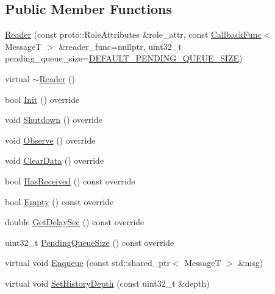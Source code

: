 \subsection*{Public Member Functions}
\begin{DoxyCompactItemize}
\item 
\hyperlink{classapollo_1_1cyber_1_1Reader_a69f4d76924d5313aa62254b479f74741}{Reader} (const proto\-::\-Role\-Attributes \&role\-\_\-attr, const \hyperlink{namespaceapollo_1_1cyber_ac2b119de9ef52dbfcee3b6e8d497adc4}{Callback\-Func}$<$ Message\-T $>$ \&reader\-\_\-func=nullptr, uint32\-\_\-t pending\-\_\-queue\-\_\-size=\hyperlink{namespaceapollo_1_1cyber_a2f6db02a0b926d2d76f73ce52c149047}{D\-E\-F\-A\-U\-L\-T\-\_\-\-P\-E\-N\-D\-I\-N\-G\-\_\-\-Q\-U\-E\-U\-E\-\_\-\-S\-I\-Z\-E})
\item 
virtual \hyperlink{classapollo_1_1cyber_1_1Reader_a23bf2eaed41aa7764fdc5f3d0f6dc3f4}{$\sim$\-Reader} ()
\item 
bool \hyperlink{classapollo_1_1cyber_1_1Reader_a249fd8fc318b8f86d018d2016b926ca4}{Init} () override
\item 
void \hyperlink{classapollo_1_1cyber_1_1Reader_accc21ea8144e9c577be55ca03e152769}{Shutdown} () override
\item 
void \hyperlink{classapollo_1_1cyber_1_1Reader_a00b3cdc0a487ed6fe0f68e703166d391}{Observe} () override
\item 
void \hyperlink{classapollo_1_1cyber_1_1Reader_ab286c2d587e10eadb339bcf55f4a9567}{Clear\-Data} () override
\item 
bool \hyperlink{classapollo_1_1cyber_1_1Reader_aca67f3936aa209c1a73f1ca984062f3a}{Has\-Received} () const override
\item 
bool \hyperlink{classapollo_1_1cyber_1_1Reader_ab3e96bf171f2d1fbbafa40da14590548}{Empty} () const override
\item 
double \hyperlink{classapollo_1_1cyber_1_1Reader_a51cdaa33430e6c1b2905336066a4b6f2}{Get\-Delay\-Sec} () const override
\item 
uint32\-\_\-t \hyperlink{classapollo_1_1cyber_1_1Reader_a9f787ae54e884141d13396345b56c9e2}{Pending\-Queue\-Size} () const override
\item 
virtual void \hyperlink{classapollo_1_1cyber_1_1Reader_a9acce2d137849540e434596de51b10bf}{Enqueue} (const std\-::shared\-\_\-ptr$<$ Message\-T $>$ \&msg)
\item 
virtual void \hyperlink{classapollo_1_1cyber_1_1Reader_a20a9b73c463c8f65b9592bb295745fa6}{Set\-History\-Depth} (const uint32\-\_\-t \&depth)
\item 

\end{DoxyCompactItemize}
